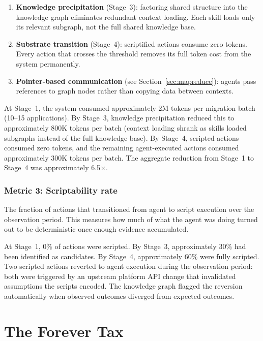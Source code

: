 \documentclass[11pt]{article}
\theoremstyle{definition}
\begin{document}
\begin{enumerate}
\item \textbf{Knowledge precipitation} (Stage~3): factoring shared
   structure into the knowledge graph eliminates redundant context
   loading. Each skill loads only its relevant subgraph, not the full
   shared knowledge base.
\item \textbf{Substrate transition} (Stage~4): scriptified actions
   consume zero tokens. Every action that crosses the threshold
   removes its full token cost from the system permanently.
\item \textbf{Pointer-based communication} (see
   Section~\ref{sec:mapreduce}): agents pass references to graph
   nodes rather than copying data between contexts.
\end{enumerate}

At Stage~1, the system consumed approximately 2M tokens per migration
batch (10--15 applications). By Stage~3, knowledge precipitation
reduced this to approximately 800K tokens per batch (context loading
shrank as skills loaded subgraphs instead of the full knowledge base).
By Stage~4, scripted actions consumed zero tokens, and the remaining
agent-executed actions consumed approximately 300K tokens per batch.
The aggregate reduction from Stage~1 to Stage~4 was approximately
6.5$\times$.

\subsubsection{Metric 3: Scriptability rate}

The fraction of actions that transitioned from agent to script
execution over the observation period. This measures how much of
what the agent was doing turned out to be deterministic once enough
evidence accumulated.

At Stage~1, 0\% of actions were scripted. By Stage~3, approximately
30\% had been identified as candidates. By Stage~4, approximately
60\% were fully scripted. Two scripted actions reverted to agent
execution during the observation period: both were triggered by an
upstream platform API change that invalidated assumptions the scripts
encoded. The knowledge graph flagged the reversion automatically
when observed outcomes diverged from expected outcomes.

\section{The Forever Tax}
\label{sec:forever-tax}
\end{document}
